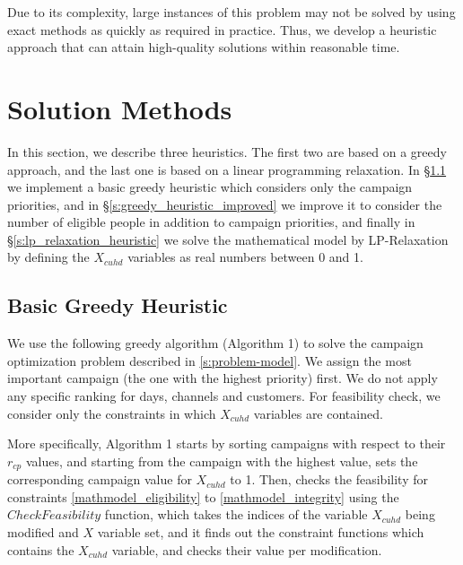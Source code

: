\documentclass[11pt]{article}
\begin{document}
Due to its complexity, large instances of this problem may not be solved by using exact methods as quickly as required in practice. Thus, we develop a heuristic approach that can attain high-quality solutions within reasonable time.


\section{Solution Methods}  \label{s:solution-method}

In this section, we describe three heuristics. The first two are based on a greedy approach, and the last one is based on a linear programming relaxation. In \S \ref{s:greedy_heuristic_basic} we implement a basic greedy heuristic which considers only the campaign priorities, and in \S \ref{s:greedy_heuristic_improved} we improve it to consider the number of eligible people in addition to campaign priorities, and finally in \S \ref{s:lp_relaxation_heuristic} we solve the mathematical model by LP-Relaxation by defining the  $X_{{c}{u}{h}{d}}$ variables as real numbers between 0 and 1.

\subsection{Basic Greedy Heuristic} \label{s:greedy_heuristic_basic}

We use the following greedy algorithm (Algorithm 1) to solve the campaign optimization problem described in \ref{s:problem-model}. We assign  the most important campaign (the one with the highest priority) first. We do not apply any specific ranking for days, channels and customers. For feasibility check, we consider only the constraints in which $X_{{c}{u}{h}{d}}$ variables are contained.

More specifically, Algorithm 1 starts by sorting campaigns with respect to their $r_{cp}$ values, and starting from the campaign with the highest value, sets the corresponding campaign value for $X_{cuhd}$ to 1. Then, checks the feasibility for constraints \eqref{mathmodel_eligibility} to \eqref{mathmodel_integrity} using the $CheckFeasibility$ function, which takes the indices of the variable $X_{cuhd}$ being modified and $X$ variable set, and it finds out the constraint functions which contains the $X_{cuhd}$ variable, and checks their value per modification.
\\
\end{document}
